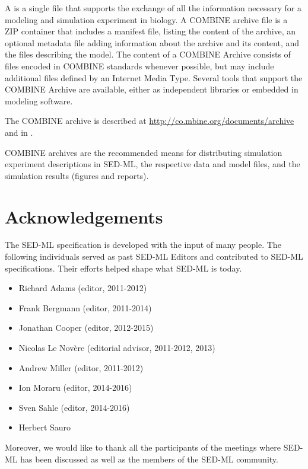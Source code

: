 \documentclass[pdftex,rgb,dvipsnames,svgnames,hyperref,table]{report}
\begin{document}
A  \citep{Bergmann2014} is a single file that supports the exchange of all the information necessary for a modeling and simulation experiment in biology. A COMBINE archive file is a ZIP container that includes a manifest file, listing the content of the archive, an optional metadata file adding information about the archive and its content, and the files describing the model. The content of a COMBINE Archive consists of files encoded in COMBINE standards whenever possible, but may include additional files defined by an Internet Media Type. Several tools that support the COMBINE Archive are available, either as independent libraries or embedded in modeling software.

The COMBINE archive is described at \url{http://co.mbine.org/documents/archive} and 
in \citep{Bergmann2014}.

COMBINE archives are the recommended means for distributing simulation experiment descriptions in SED-ML, the respective data and model files, and the simulation results (figures and reports).

\chapter{Acknowledgements}
\label{chp:acknowledgments}
The SED-ML specification is developed with the input of many people. The following individuals served as past SED-ML Editors and contributed to SED-ML specifications. Their efforts helped shape what SED-ML is today.

\begin{itemize}
\item Richard Adams (editor, 2011-2012)
\item Frank Bergmann (editor, 2011-2014)
\item Jonathan Cooper (editor, 2012-2015)
\item Nicolas Le Novère (editorial advisor, 2011-2012, 2013)
\item Andrew Miller (editor, 2011-2012)
\item Ion Moraru (editor, 2014-2016)
\item Sven Sahle (editor, 2014-2016)
\item Herbert Sauro
\end{itemize}

Moreover, we would like to thank all the participants of the meetings where SED-ML has been discussed as well as the members of the SED-ML community.
\end{document}
